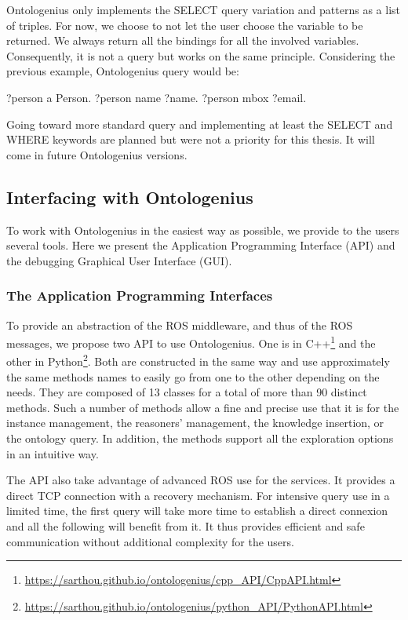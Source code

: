 Ontologenius only implements the SELECT query variation and patterns as a list of triples. For now, we choose to not let the user choose the variable to be returned. We always return all the bindings for all the involved variables. Consequently, it is not a \sparql{} query but works on the same principle. Considering the previous example, Ontologenius query would be:

\begin{verbatimtab}
?person a Person. ?person name ?name. ?person mbox ?email.
\end{verbatimtab}

Going toward more standard query and implementing at least the SELECT and WHERE keywords are planned but were not a priority for this thesis. It will come in future Ontologenius versions.

\subsection{Interfacing with Ontologenius}

To work with Ontologenius in the easiest way as possible, we provide to the users several tools. Here we present the Application Programming Interface (API) and the debugging Graphical User Interface (GUI).

\subsubsection{The Application Programming Interfaces}

To provide an abstraction of the ROS middleware, and thus of the ROS messages, we propose two API to use Ontologenius. One is in C++\footnote{\url{https://sarthou.github.io/ontologenius/cpp_API/CppAPI.html}} and the other in Python\footnote{\url{https://sarthou.github.io/ontologenius/python_API/PythonAPI.html}}. Both are constructed in the same way and use approximately the same methods names to easily go from one to the other depending on the needs. They are composed of 13 classes for a total of more than 90 distinct methods. Such a number of methods allow a fine and precise use that it is for the instance management, the reasoners' management, the knowledge insertion, or the ontology query. In addition, the methods support all the exploration options in an intuitive way.

The API also take advantage of advanced ROS use for the services. It provides a direct TCP connection with a recovery mechanism. For intensive query use in a limited time, the first query will take more time to establish a direct connexion and all the following will benefit from it. It thus provides efficient and safe communication without additional complexity for the users.

